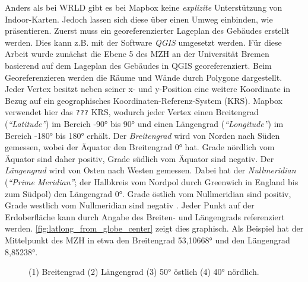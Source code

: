 Anders als bei WRLD gibt es bei Mapbox keine \emph{explizite} Unterstützung von Indoor-Karten.
Jedoch lassen sich diese über einen Umweg einbinden, wie \textcites{Mapbox2018b}{Pavani2018}{Clarke2017} präsentieren.
Zuerst muss ein georeferenzierter Lageplan des Gebäudes erstellt werden.
Dies kann z.B. mit der Software \emph{QGIS} umgesetzt werden.
Für diese Arbeit wurde zunächst die Ebene 5 des MZH an der Universität Bremen basierend auf dem Lageplan des Gebäudes in QGIS georeferenziert.
Beim Georeferenzieren werden die Räume und Wände durch Polygone dargestellt.
Jeder Vertex besitzt neben seiner x- und y-Position eine weitere Koordinate in Bezug auf ein geographisches Koordinaten-Referenz-System (KRS).
Mapbox verwendet hier das \texttt{???} KRS, wodurch jeder Vertex einen Breitengrad (\emph{\enquote{Latitude}}) im Bereich \ang{-90} bis \ang{90} und einen Längengrad (\emph{\enquote{Longitude}}) im Bereich \ang{-180} bis \ang{180} erhält.
Der \emph{Breitengrad} wird von Norden nach Süden gemessen, wobei der Äquator den Breitengrad \ang{0} hat.
Grade nördlich vom Äquator sind daher positiv, Grade südlich vom Äquator sind negativ.
Der \emph{Längengrad} wird von Osten nach Westen gemessen.
Dabei hat der \emph{Nullmeridian} (\emph{\enquote{Prime Meridian}}; der Halbkreis vom Nordpol durch Greenwich in England bis zum Südpol) den Längengrad \ang{0}.
Grade östlich vom Nullmeridian sind positiv, Grade westlich vom Nullmeridian sind negativ \autocite{ESRIInc2018}.
Jeder Punkt auf der Erdoberfläche kann durch Angabe des Breiten- und Längengrads referenziert werden.
\autoref{fig:latlong_from_globe_center} zeigt dies graphisch.
Als Beispiel hat der Mittelpunkt des MZH in etwa den Breitengrad \ang{53,10668} und den Längengrad \ang{8,85238}.

\begin{figure}
    \centering
    \caption{(1) Breitengrad (2) Längengrad (3) \ang[detect-weight=true]{50} östlich (4) \ang[detect-weight=true]{40} nördlich. }
    \label{fig:latlong_from_globe_center}
\end{figure}

